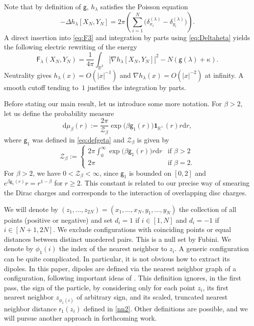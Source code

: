 \documentclass[a4paper,10pt,leqno]{amsart}
\numberwithin{equation}{section}
\newcommand{\R}{\mathbb{R}}
\newcommand{\dd}{\mathrm{d}}
\def\nab{\nabla}
\def\indic{\mathbf{1}}
\def\XN{X_N}
\def\g{\mathsf{g}}
\def\F{\mathsf{F}}
\def\rr{\mathsf{r}}
\begin{document}
Note that by definition of $\g$, $h_\lambda$ satisfies the Poisson equation
\begin{equation}\label{eq:Deltaheta}
  -\Delta h_\lambda[X_N, Y_N]= 2\pi \left( \sum_{i=1}^N \bigl(\delta_{x_i}^{(\lambda)}-\delta_{y_i}^{(\lambda)}\bigr)\right).\end{equation}
A direct insertion into \eqref{eq:F3} and integration by parts using \eqref{eq:Deltaheta} yields the following electric rewriting of the energy
\begin{equation}\label{eq:rewrF}\F_\lambda(\XN, Y_N)= \frac{1}{4\pi} \int_{\R^2} \left|\nab h_\lambda[X_N, Y_N]\right|^2 - N (\g(\lambda)+\kappa).\end{equation}
Neutrality gives $h_\lambda(x)=O(|x|^{-1})$ and $\nabla h_\lambda(x)=O(|x|^{-2})$ at infinity. A smooth cutoff tending to~$1$ justifies the integration by parts.

Before stating our main result, let us introduce some more notation.
For $\beta>2$, let us define the probability measure
\begin{equation*}
  \dd \mu_\beta(r):=\frac{2\pi}{\mathcal Z_\beta}\exp\Bigr(\beta\g_1(r)\Bigr)\indic_{\R^+}(r)r \dd r,
\end{equation*}
where $\g_1$ was defined in \eqref{eq:defgeta} and $\mathcal Z_\beta$ is given by
\begin{equation}\label{def:Cbeta}
  \mathcal Z_{\beta}:=\begin{cases}
    2\pi\int_0^{\infty}\exp\Bigr(\beta\g_1(r)\Bigr)r \dd r & \text{if $\beta>2$}\\
    2\pi & \text{if $\beta=2$}.
  \end{cases}
\end{equation}
For $\beta>2$, we have $0<\mathcal Z_\beta<\infty$, since $\g_1$ is bounded on $[0,2]$ and $e^{\beta\g_1(r)}r=r^{1-\beta}$ for $r\ge2$. This constant is related to our precise way of smearing the Dirac charges and corresponds to the interaction of overlapping disc charges.

We will denote by $(z_1,\dots,z_{2N})=(x_1,\dots,x_N,y_1,\dots,y_N)$ the collection of all points (positive or negative) and set $d_i=1$ if $i\in [1,N]$ and $d_i=-1$ if $i\in [N+1, 2N]$.
We exclude configurations with coinciding points or equal distances between distinct unordered pairs. This is a null set by Fubini. We denote by $\phi_1(i)$ the index of the nearest neighbor to $z_i$.
A generic configuration can be quite complicated. In particular, it is not obvious how to extract its dipoles.
In this paper, dipoles are defined via the nearest neighbor graph of a configuration, following important ideas of \cite{GunPan}. This definition ignores, in the first pass, the sign of the particle, by considering only for each point $z_i$, its first nearest neighbor $z_{\phi_1(i)}$ of arbitrary sign, and its scaled, truncated nearest neighbor distance $\rr_1(z_i)$ defined in \eqref{nn2}.
Other definitions are possible, and we will pursue another approach in forthcoming work.
\end{document}
